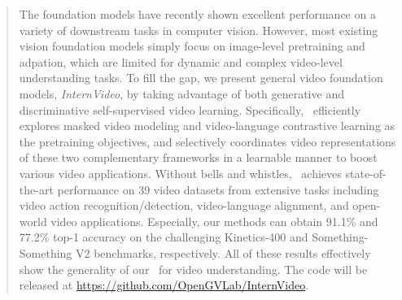 \begin{abstract}
The foundation models have recently shown excellent performance on a variety of downstream tasks in computer vision. However, most existing vision foundation models simply focus on image-level pretraining and adpation, which are limited for dynamic and complex video-level understanding tasks. To fill the gap, we present general video foundation models, \textit{InternVideo}, by taking advantage of both generative and discriminative self-supervised video learning. Specifically, \model~efficiently explores masked video modeling and video-language contrastive learning as the pretraining objectives, and selectively coordinates video representations of these two complementary frameworks in a learnable manner to boost various video applications. Without bells and whistles, \model~achieves state-of-the-art performance on 39 video datasets from extensive tasks including video action recognition/detection,
video-language alignment, and open-world video applications. Especially,
our methods can obtain 91.1\% and 77.2\% top-1 accuracy on the challenging Kinetics-400 and Something-Something V2 benchmarks, respectively.
All of these results effectively show the generality of our \model~for video understanding. The code will be released at \href{https://github.com/OpenGVLab/InternVideo}{https://github.com/OpenGVLab/InternVideo}.

\end{abstract}